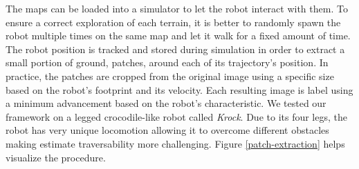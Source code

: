 \documentclass[../document.tex]{subfiles}
\begin{document}
The maps can be loaded into a simulator to let the robot interact with them. To ensure a correct exploration of each terrain, it is better to randomly spawn the robot multiple times on the same map and let it walk for a fixed amount of time. The robot position is tracked and stored during simulation in order to extract a small portion of ground, patches, around each of its trajectory's position. In practice, the patches are cropped from the original image using a specific size based on the robot's footprint and its velocity. Each resulting image is label using a minimum advancement based on the robot's characteristic. We tested our framework on a legged crocodile-like robot called \emph{Krock}. Due to its four legs, the robot has very unique locomotion allowing it to overcome different obstacles making estimate traversability more challenging. Figure \ref{patch-extraction} helps visualize the procedure.
\end{document}
